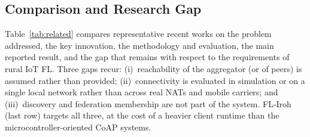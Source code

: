 \subsection{Comparison and Research Gap}

Table~\ref{tab:related} compares representative recent works on the problem addressed, the key innovation, the methodology and evaluation, the main reported result, and the gap that remains with respect to the requirements of rural IoT FL. Three gaps recur: (i)~reachability of the aggregator (or of peers) is assumed rather than provided; (ii)~connectivity is evaluated in simulation or on a single local network rather than across real NATs and mobile carriers; and (iii)~discovery and federation membership are not part of the system. FL-Iroh (last row) targets all three, at the cost of a heavier client runtime than the microcontroller-oriented CoAP systems.

